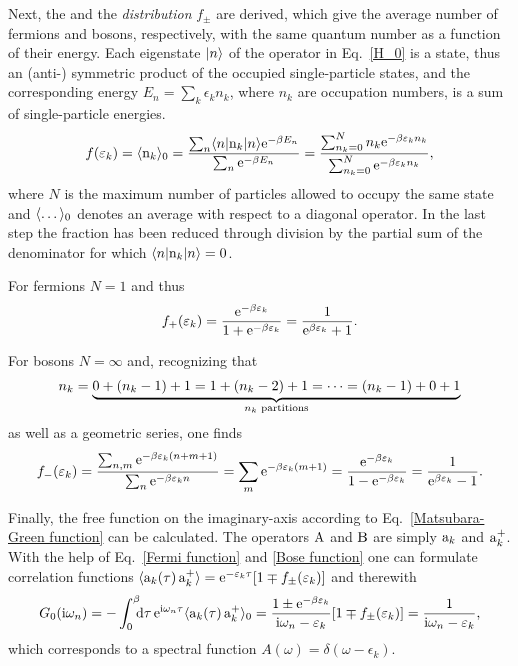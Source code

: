 Next, the \emph{} and the \emph{
distribution} $f_\pm$ are derived, which give the average number of fermions and
bosons, respectively, with the same quantum number as a function of their
energy. Each eigenstate $|n\rangle$ of the  operator in
Eq.~\ref{H_0} is a  state, thus an (anti-) symmetric product of the
occupied single-particle states, and the corresponding energy $E_n = \sum_k
\epsilon_k n_k$, where $n_k$ are occupation numbers, is a sum of single-particle
energies.
%
\begin{equation*}
    f(\varepsilon_k) = \langle\mathrm n_k\rangle_0 = \frac{\sum_n \langle n| \mathrm n_k |n\rangle \mathrm e^{-\beta E_n}}{\sum_n \mathrm e^{-\beta E_n}} = \frac{\sum_{n_k = 0}^N n_k \mathrm e^{-\beta \varepsilon_k n_k}}{\sum_{n_k = 0}^N \mathrm e^{-\beta \varepsilon_k n_k}},
\end{equation*}
%
where $N$ is the maximum number of particles allowed to occupy the same state
and $\langle\dots\rangle_0$ denotes an average with respect to a diagonal 
operator. In the last step the fraction has been reduced through division by the
partial sum of the denominator for which $\langle n| \mathrm n_k |n\rangle = 0$.

For fermions $N = 1$ and thus
%
\begin{equation} \label{Fermi function}
    f_+(\varepsilon_k) = \frac{\mathrm e^{-\beta \varepsilon_k}}{1 + \mathrm e^{-\beta \varepsilon_k}}
    = \frac 1 {\mathrm e^{\beta \varepsilon_k} + 1}.
\end{equation}

For bosons $N = \infty$ and, recognizing that
%
\begin{equation*}
    n_k = \underbrace{
        0 + (n_k - 1) + 1 = 1 + (n_k - 2) + 1 = \dots = (n_k - 1) + 0 + 1
    } \sb{\text{$n_k$ partitions}}
\end{equation*}
%
as well as a geometric series, one finds
%
\begin{equation} \label{Bose function}
    f_-(\varepsilon_k)
    = \frac {\sum_{n, m} \mathrm e^{-\beta \varepsilon_k (n + m + 1)}}
        {\sum_n \mathrm e^{-\beta \varepsilon_k n}}
    = \sum_m \mathrm e^{-\beta \varepsilon_k (m + 1)}
    = \frac{\mathrm e^{-\beta \varepsilon_k}}{1 - \mathrm e^{-\beta \varepsilon_k}}
    = \frac 1 {\mathrm e^{\beta \varepsilon_k} - 1}.
\end{equation}

Finally, the free  function on the imaginary-axis
according to Eq.~\ref{Matsubara-Green function} can be calculated. The operators
$\mathrm A$ and $\mathrm B$ are simply $\mathrm a_k$ and $\mathrm a_k^+$. With the help of
Eq.~\ref{Fermi function} and \ref{Bose function} one can formulate correlation
functions $\langle\mathrm a_k(\tau) \, \mathrm a_k^+\rangle = \mathrm e^{-\varepsilon_k \tau} [1 \mp f_\pm(\varepsilon_k)]$ and therewith
%
\begin{equation*}
    G_0(\I \omega_n) = -\int \from 0 \till \beta \D \tau \,
    \E^{\I \omega_n \tau} \av{\op a_k(\tau) \, \op a_k^+}_0
    = \frac{1 \pm \E^{-\beta \epsilon_k}}{\I \omega_n - \epsilon_k}
        [1 \mp f_\pm(\epsilon_k)]
    = \frac 1 {\I \omega_n - \epsilon_k},
\end{equation*}
%
which corresponds to a spectral function $A(\omega) = \delta(\omega -
\epsilon_k)$.

